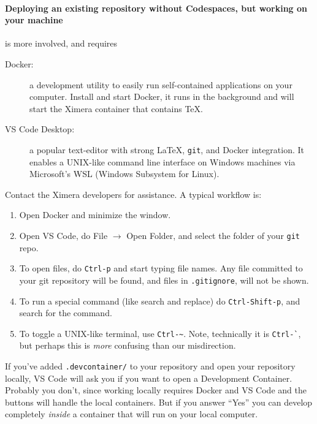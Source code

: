 \documentclass{ximera}
\begin{document}
\paragraph{Deploying an existing repository without Codespaces, but working on your machine} is more involved, and requires
\begin{description}
    \item[Docker:] a development utility to easily run
        self-contained applications on your
        computer. Install and start Docker, it runs in the background and will start the Ximera container that contains TeX.
    \item[VS Code Desktop:] a popular text-editor with strong \LaTeX, \verb!git!,
        and Docker integration. It enables a UNIX-like command line interface on
        Windows machines via Microsoft's WSL (Windows Subsystem for Linux).
\end{description}
Contact the Ximera developers for assistance. A typical workflow is:
\begin{enumerate}
    \item Open Docker and minimize the window.
    \item Open VS Code, do File $\to$ Open Folder, and select the
          folder of your \verb!git! repo.
    \item To open files, do \verb!Ctrl-p! and start typing file names. Any
          file
          committed to your git repository will be found, and files in
          \verb!.gitignore!, will not be shown.
    \item To run a special command (like search and replace) do
          \verb!Ctrl-Shift-p!, and search for the command.
    \item To toggle a UNIX-like terminal, use \verb!Ctrl-~!. Note, technically
          it is \verb!Ctrl-`!, but perhaps this is \textit{more} confusing than our
          misdirection.
\end{enumerate}

\begin{warning}
    If you've added \verb!.devcontainer/! to your repository and open your repository
    locally, VS Code will ask you if you want to open a Development Container.
    Probably you don't, since working locally requires Docker and VS Code and the buttons will handle the local containers.
    But if you answer ``Yes'' you can develop completely \textit{inside} a container that will run on your local computer. 
\end{warning}
\end{document}
